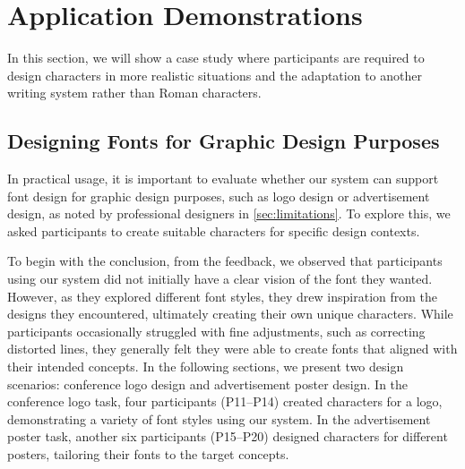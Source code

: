 \section{Application Demonstrations}
\label{sec:demonstration}
In this section, we will show a case study where participants are required to design characters in more realistic situations and the adaptation to another writing system rather than Roman characters.


\subsection{Designing Fonts for Graphic Design Purposes}
\label{sec:demonstration_graphic_design}
In practical usage, it is important to evaluate whether our system can support font design for graphic design purposes, such as logo design or advertisement design, as noted by professional designers in \autoref{sec:limitations}.
To explore this, we asked participants to create suitable characters for specific design contexts.

To begin with the conclusion, from the feedback, we observed that participants using our system did not initially have a clear vision of the font they wanted. 
However, as they explored different font styles, they drew inspiration from the designs they encountered, ultimately creating their own unique characters.
While participants occasionally struggled with fine adjustments, such as correcting distorted lines, they generally felt they were able to create fonts that aligned with their intended concepts.
In the following sections, we present two design scenarios: conference logo design and advertisement poster design.
In the conference logo task, four participants (P11--P14) created characters for a logo, demonstrating a variety of font styles using our system.
In the advertisement poster task, another six participants (P15--P20) designed characters for different posters, tailoring their fonts to the target concepts.

